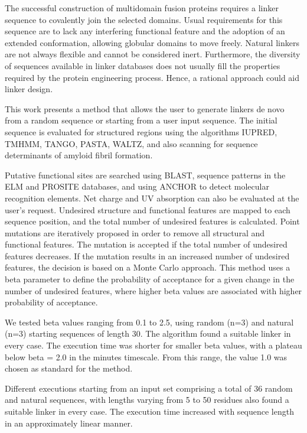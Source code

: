 

The successful construction of multidomain fusion proteins requires a linker sequence to covalently join the
selected domains. Usual requirements for this sequence are to lack any interfering functional feature and the
adoption of an extended conformation, allowing globular domains to move freely.
Natural linkers are not always flexible and cannot be considered inert. Furthermore, the diversity of sequences
available in linker databases does not usually fill the properties required by the protein engineering process.
Hence, a rational approach could aid linker design.

This work presents a method that allows the user to generate linkers de novo from a random 
sequence or starting from a user input sequence.
The initial sequence is evaluated for structured regions using the algorithms IUPRED, TMHMM, TANGO, PASTA, WALTZ, 
and also scanning for sequence determinants of amyloid fibril formation. 

Putative functional sites are searched using BLAST, sequence patterns in the ELM and
PROSITE databases, and using ANCHOR to detect molecular recognition elements. 
Net charge and UV absorption can also be evaluated at the user’s request. 
Undesired structure and functional features are mapped to each sequence position, and the total number of undesired
features is calculated.
Point mutations are iteratively proposed in order to remove all structural and functional features. The mutation is
accepted if the total number of undesired features decreases. If the mutation results in an increased number of
undesired features, the decision is based on a Monte Carlo approach. This method uses a beta parameter to
define the probability of acceptance for a given change in the number of undesired features, where higher beta
values are associated with higher probability of acceptance.

We tested beta values ranging from 0.1 to 2.5, using random (n=3) and natural (n=3) starting sequences of length
30. The algorithm found a suitable linker in every case. The execution time was shorter for smaller beta values,
with a plateau below beta = 2.0 in the minutes timescale. 
From this range, the value 1.0 was chosen as standard for the method.

Different executions starting from an input set comprising a total of 36 random and natural sequences, with lengths
varying from 5 to 50 residues also found a suitable linker in every case. 
The execution time increased with sequence length in an approximately linear manner.



